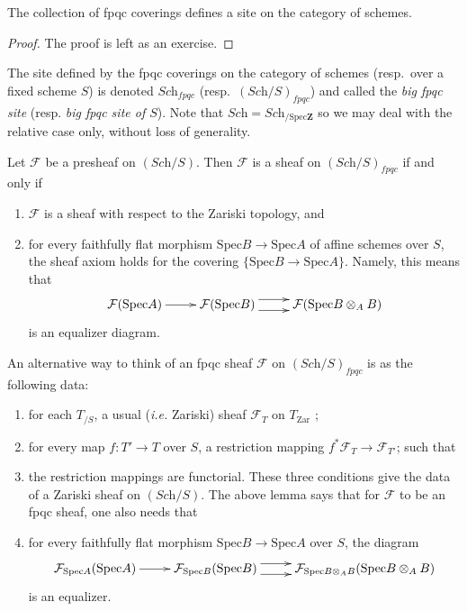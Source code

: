 \begin{lemma}
\label{lemma-site-fpqc}
The collection of fpqc coverings defines a site on the category of schemes.
\end{lemma}

\begin{proof}
The proof is left as an exercise.
\end{proof}

\begin{definition}
\label{definition-fpqc-site}
The site defined by the fpqc coverings on the category of schemes 
(resp.\ over a fixed scheme $S$) is denoted $\textit{Sch}_{fpqc}$
(resp.\ $(\textit{Sch}/S)_{fpqc}$) and called the
{\it big fpqc site} (resp. {\it big fpqc site of $S$}).
Note that $\textit{Sch} = \textit{Sch}_{/\text{Spec}\mathbf{Z}}$ so we 
may deal with the relative case only, without loss of generality. 
\end{definition}

\begin{lemma}
\label{lemma-fpqc-sheaves}
Let $\mathcal{F}$ be a presheaf on $(\textit{Sch}/S)$. Then $\mathcal{F}$ is a 
sheaf on $(\textit{Sch}/S)_{fpqc}$ if and only if
\begin{enumerate}
\item $\mathcal{F}$ is a sheaf with respect to the Zariski topology, and
\item for every faithfully flat morphism $\text{Spec} B \to \text{Spec} A$ of 
affine schemes over $S$, the sheaf axiom holds for the covering $\{\text{Spec} 
B \to \text{Spec} A\}$. Namely, this means that 
$$
\xymatrix{
\mathcal{F}(\text{Spec} A) \ar[r] &
\mathcal{F}(\text{Spec} B) \ar@<1ex>[r] \ar@<-1ex>[r] &
\mathcal{F}(\text{Spec} B \otimes_A B)
}
$$
is an equalizer diagram.
\end{enumerate}
\end{lemma}

\noindent
An alternative way to think of an fpqc sheaf $\mathcal{F}$ on 
$(\textit{Sch}/S)_{fpqc}$ is as the following data:
\begin{enumerate}
\item for each $T_{/S}$, a usual ({\it i.e.} Zariski) sheaf $\mathcal{F}_T$ on 
$T_{\mathrm{Zar}}$ ;
\item for every map $f : T' \to T$ over $S$, a restriction mapping $f^* 
\mathcal{F}_T \to \mathcal{F}_{T'} $; such that
\item the restriction mappings are functorial. These three conditions give the 
data of a Zariski sheaf on $(\textit{Sch}/S)$. The above lemma says that for 
$\mathcal{F}$ to be an fpqc sheaf, one also needs that
\item for every faithfully flat morphism $\text{Spec} B \to \text{Spec} A$ over 
$S$, the diagram 
$$
\xymatrix{
\mathcal{F}_{\text{Spec} A}(\text{Spec} A) \ar[r] &
\mathcal{F}_{\text{Spec} B}(\text{Spec} B) \ar@<1ex>[r] \ar@<-1ex>[r] &
\mathcal{F}_{\text{Spec} B \otimes_A B}(\text{Spec} B \otimes_A B)
}
$$
is an equalizer.
\end{enumerate}

